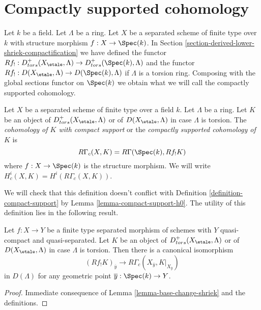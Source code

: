 \section{Compactly supported cohomology}
\label{section-compactly-supported-cohomology}

\noindent
Let $k$ be a field. Let $\Lambda$ be a ring. Let $X$ be a separated scheme
of finite type over $k$ with structure morphism $f : X \to \Spec(k)$.
In Section \ref{section-derived-lower-shriek-compactification}
we have defined the functor
$Rf_! : D^+_{tors}(X_\etale, \Lambda) \to D^+_{tors}(\Spec(k), \Lambda)$
and the functor $Rf_! : D(X_\etale, \Lambda) \to D(\Spec(k), \Lambda)$
if $\Lambda$ is a torsion ring. Composing with the global sections functor
on $\Spec(k)$ we obtain what we will call the compactly supported cohomology.

\begin{definition}
\label{definition-cohomology-compact-support}
Let $X$ be a separated scheme of finite type over a field $k$.
Let $\Lambda$ be a ring. Let $K$ be an object of
$D^+_{tors}(X_\etale, \Lambda)$
or of $D(X_\etale, \Lambda)$ in case $\Lambda$ is torsion.
The {\it cohomology of $K$ with compact support} or the
{\it compactly supported cohomology of $K$} is
$$
R\Gamma_c(X, K) = R\Gamma(\Spec(k), Rf_!K)
$$
where $f : X \to \Spec(k)$ is the structure morphism. We will
write  $H^i_c(X, K) = H^i(R\Gamma_c(X, K))$.
\end{definition}

\noindent
We will check that this definition doesn't conflict with
Definition \ref{definition-compact-support} by
Lemma \ref{lemma-compact-support-h0}.
The utility of this definition lies in the following result.

\begin{lemma}
\label{lemma-stalk-R-f-shriek}
Let $f : X \to Y$ be a finite type separated morphism of schemes
with $Y$ quasi-compact and quasi-separated. Let $K$ be an object of
$D^+_{tors}(X_\etale, \Lambda)$ or of $D(X_\etale, \Lambda)$ in case
$\Lambda$ is torsion. Then there is a canonical isomorphism
$$
(Rf_!K)_{\overline{y}}
\longrightarrow
R\Gamma_c(X_{\overline{y}}, K|_{X_{\overline{y}}})
$$
in $D(\Lambda)$ for any geometric point $\overline{y} : \Spec(k) \to Y$.
\end{lemma}

\begin{proof}
Immediate consequence of Lemma \ref{lemma-base-change-shriek} and the
definitions.
\end{proof}

